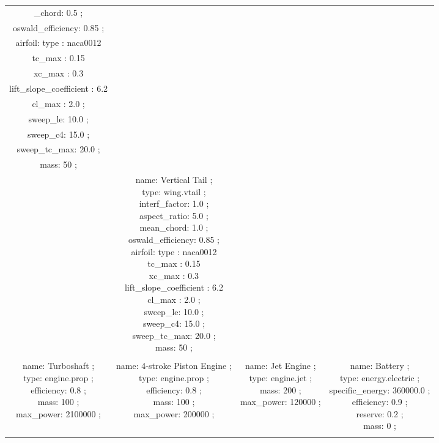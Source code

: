 \begin{table}[h]
\begin{adjustbox}{width=1\textwidth}
\begin{tabular}{|c|c|c|c|}
_chord: 0.5 ; \\ oswald\_efficiency: 0.85 ; \\ airfoil:   type :  naca0012  \\   tc\_max : 0.15 \\   xc\_max : 0.3 \\   lift\_slope\_coefficient : 6.2 \\   cl\_max : 2.0  ; \\ sweep\_le: 10.0 ; \\ sweep\_c4: 15.0 ; \\ sweep\_tc\_max: 20.0 ; \\ mass: 50 ; \\ } & \makecell{name: Vertical Tail ; \\ type: wing.vtail ; \\ interf\_factor: 1.0 ; \\ aspect\_ratio: 5.0 ; \\ mean\_chord: 1.0 ; \\ oswald\_efficiency: 0.85 ; \\ airfoil:   type :  naca0012  \\   tc\_max : 0.15 \\   xc\_max : 0.3 \\   lift\_slope\_coefficient : 6.2 \\   cl\_max : 2.0  ; \\ sweep\_le: 10.0 ; \\ sweep\_c4: 15.0 ; \\ sweep\_tc\_max: 20.0 ; \\ mass: 50 ; \\ }\\ \hline \\ 
\makecell{name: Turboshaft ; \\ type: engine.prop ; \\ efficiency: 0.8 ; \\ mass: 100 ; \\ max\_power: 2100000 ; \\ } & \makecell{name: 4-stroke Piston Engine ; \\ type: engine.prop ; \\ efficiency: 0.8 ; \\ mass: 100 ; \\ max\_power: 200000 ; \\ } & \makecell{name: Jet Engine ; \\ type: engine.jet ; \\ mass: 200 ; \\ max\_power: 120000 ; \\ } & \makecell{name: Battery ; \\ type: energy.electric ; \\ specific\_energy: 360000.0 ; \\ efficiency: 0.9 ; \\ reserve: 0.2 ; \\ mass: 0 ; \\ }\\ \hline \\ 

\end{tabular}
\end{adjustbox}
\end{table}
